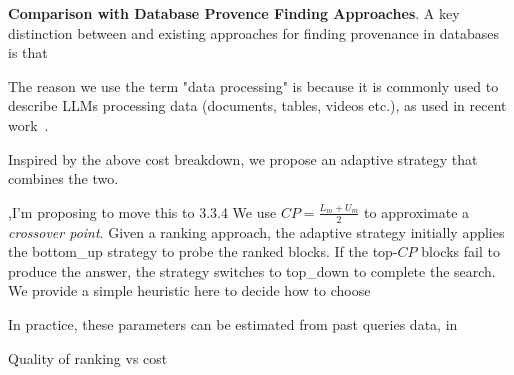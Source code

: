 \textbf{Comparison with Database Provence Finding Approaches}. A key distinction between \sys and existing approaches for finding provenance in databases is that 


The reason we use the term "data processing" is because it is commonly used
to describe LLMs processing data (documents, tables, videos etc.),
as used in recent work~\cite{}.
\fi






Inspired by the above cost breakdown, we propose an adaptive strategy that combines the two. 



\sep{I'm proposing to move this to 3.3.4}
 We use $CP = \frac{L_m + U_m}{2}$ to approximate a {\em crossover point}. 
Given a ranking approach, the adaptive strategy initially applies the bottom\_up strategy to probe the ranked blocks. If the top-$CP$ blocks fail to produce the answer, the strategy switches to top\_down to complete the search.  
We provide a simple heuristic here to decide how to choose 

In practice, these parameters can be estimated from past queries data, in 


Quality of ranking vs cost
\fi







